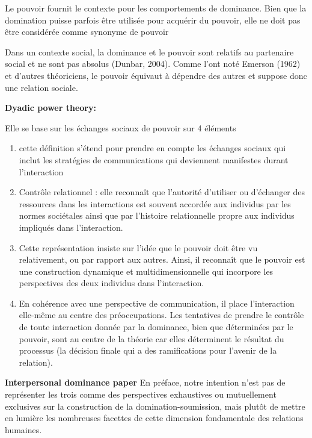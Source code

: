 Le pouvoir fournit le contexte pour les comportements de dominance. Bien que la domination puisse parfois être utilisée pour acquérir du pouvoir, elle ne doit pas être considérée comme synonyme de pouvoir %

Dans un contexte social, la dominance et le pouvoir sont relatifs au partenaire social et ne sont pas absolus (Dunbar, 2004). 
Comme l'ont noté Emerson (1962) et d'autres théoriciens, le pouvoir équivaut à dépendre des autres et suppose donc une relation sociale.

\textbf{Dyadic power theory:}


Elle se base sur les échanges sociaux de pouvoir sur 4 éléments

\begin{enumerate}
	\item cette définition s'étend pour prendre en compte les échanges sociaux qui inclut les stratégies de communications qui deviennent manifestes durant l'interaction
	\item Contrôle relationnel : elle reconnaît que l'autorité d'utiliser ou d'échanger des ressources dans les interactions est souvent accordée aux individus par les normes sociétales ainsi que par l'histoire relationnelle propre aux individus impliqués dans l'interaction.
	
	\item Cette représentation insiste sur l'idée que le pouvoir doit être vu relativement, ou par rapport aux autres. Ainsi, il reconnaît que le pouvoir est une construction dynamique et multidimensionnelle qui incorpore les perspectives des deux individus dans l'interaction.
	\item En cohérence avec une perspective de communication, il place l'interaction elle-même au centre des préoccupations. Les tentatives de prendre le contrôle de toute interaction donnée par la dominance, bien que déterminées par le pouvoir, sont au centre de la théorie car elles déterminent le résultat du processus  (la décision finale qui a des ramifications pour l'avenir de la relation).
\end{enumerate}




\textbf{Interpersonal dominance paper}
En préface, notre intention n'est pas de représenter les trois comme des perspectives exhaustives ou mutuellement exclusives sur la construction de la domination-soumission, mais plutôt de mettre en lumière les nombreuses facettes de cette dimension fondamentale des relations humaines.

